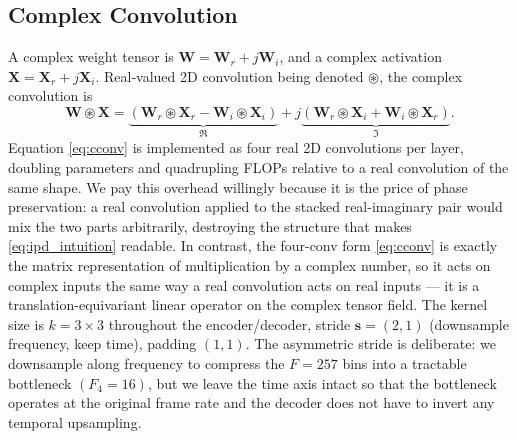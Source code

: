 \documentclass[journal,10pt]{IEEEtran}
\renewcommand{\Re}{\mathfrak{R}}
\newcommand{\Imm}{\mathfrak{I}}
\newcommand{\bW}{\mathbf{W}}
\newcommand{\bX}{\mathbf{X}}
\newcommand{\bs}{\mathbf{s}}
\newcommand{\conv}{\circledast}
\begin{document}
\subsection{Complex Convolution}
A complex weight tensor is \(\bW=\bW_r+j\bW_i\), and a complex activation \(\bX=\bX_r+j\bX_i\). Real-valued 2D convolution being denoted \(\conv\), the complex convolution is \cite{trabelsi2018deep}
\begin{equation}
\bW\conv\bX=\!\underbrace{(\bW_r\conv\bX_r\!-\!\bW_i\conv\bX_i)}_{\Re}\!+\!j\underbrace{(\bW_r\conv\bX_i\!+\!\bW_i\conv\bX_r)}_{\Imm}\!.
\label{eq:cconv}
\end{equation}
Equation \eqref{eq:cconv} is implemented as four real 2D convolutions per layer, doubling parameters and quadrupling FLOPs relative to a real convolution of the same shape. We pay this overhead willingly because it is the price of phase preservation: a real convolution applied to the stacked real-imaginary pair would mix the two parts arbitrarily, destroying the structure that makes \eqref{eq:ipd_intuition} readable. In contrast, the four-conv form \eqref{eq:cconv} is exactly the matrix representation of multiplication by a complex number, so it acts on complex inputs the same way a real convolution acts on real inputs --- it is a translation-equivariant linear operator on the complex tensor field. The kernel size is \(k=3\times 3\) throughout the encoder/decoder, stride \(\bs=(2,1)\) (downsample frequency, keep time), padding \((1,1)\). The asymmetric stride is deliberate: we downsample along frequency to compress the \(F=257\) bins into a tractable bottleneck \((F_4=16)\), but we leave the time axis intact so that the bottleneck operates at the original frame rate and the decoder does not have to invert any temporal upsampling.
\end{document}
